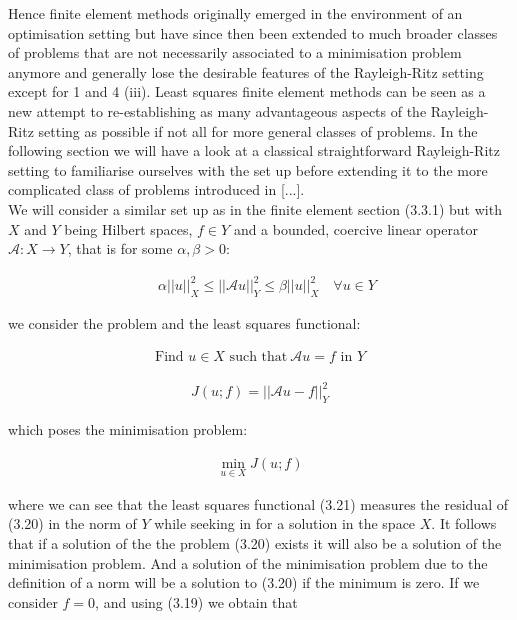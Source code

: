 \documentclass[../draft_1.tex]{subfiles}
\begin{document}
Hence finite element methods originally emerged in the environment of an optimisation setting but have since then been extended to much broader classes of problems that are not necessarily associated to a minimisation problem anymore and generally lose the desirable features of the Rayleigh-Ritz setting except for 1 and 4 (iii). Least squares finite element methods can be seen as a new attempt to re-establishing as many advantageous aspects of the Rayleigh-Ritz setting as possible if not all for more general classes of problems. In the following section we will have a look at a classical straightforward Rayleigh-Ritz setting to familiarise ourselves with the set up before extending it to the more complicated class of problems introduced in [...]. 
\smallskip
\\
We will consider a similar set up as in the finite element section (3.3.1) but with $X$ and $Y$ being Hilbert spaces, $f \in Y$ and a bounded, coercive linear operator $\mathcal{A}: X \rightarrow Y$, that is for some  $\alpha, \beta > 0$:
\begin{ceqn}
\begin{align}
\quad \alpha || u ||_X^2 \leq || \mathcal{A} u ||_Y^2 \leq \beta || u ||_X^2 \quad \forall u \in Y
\end{align} 
\end{ceqn}
we consider the problem and the least squares functional:
\begin{ceqn}
\begin{align}
 \text{Find } u \in X  \text{ such that} \ \mathcal{A} u = f \text{ in } Y	
\end{align}

\begin{align}
J(u; f) = || \mathcal{A} u - f ||_Y^2
\end{align}
\end{ceqn}
which poses the minimisation problem:
 \begin{ceqn}
\begin{align}
\min_{u \in X} J(u; f)
\end{align}
\end{ceqn}
where we can see that the least squares functional (3.21) measures the residual of (3.20) in the norm of $Y$ while seeking in for a solution in the space $X$. It follows that if a solution of the the problem (3.20) exists it will also be a solution of the minimisation problem. And a solution of the minimisation problem due to the definition of a norm will be a solution to (3.20) if the minimum is zero. If we consider $f = 0$, and using (3.19) we obtain that 
\end{document}
